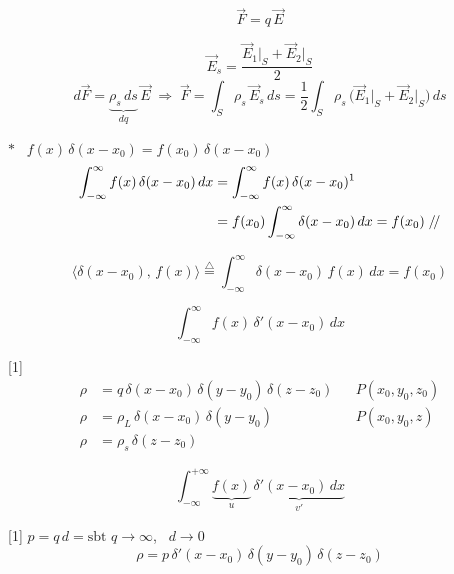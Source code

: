 \documentclass[11pt,a4paper]{article}
\begin{document}

\noindent
\begin{minipage}[c]{0.55\linewidth}
\centering
{}
\end{minipage}\hfill
\begin{minipage}[c]{0.4\linewidth}
\[ \vec F = q\,\vec E \]
\end{minipage}

\[ \vec E_s = \frac{\vec E_1\big|_S+\vec E_2\big|_S}{2} \]
\[ d\vec F = \underbrace{\rho_s\,ds}_{dq}\,\vec E \;\Rightarrow\; \vec F = \int_S \rho_s\,\vec E_s\,ds = \frac12\int_S \rho_s\,\bigl(\vec E_1\big|_S+\vec E_2\big|_S\bigr)\,ds \]

$\ast$ \ $f(x)\,\delta(x-x_0) = f(x_0)\,\delta(x-x_0)$
\begin{align*}
\int_{-\infty}^{\infty} f(x)\,\delta(x-x_0)\,dx &= \int_{-\infty}^{\infty} f(x)\,\delta(x-x_0)\text{\footnotemark} \\
 &= f(x_0)\int_{-\infty}^{\infty}\delta(x-x_0)\,dx = f(x_0)\;/\!/
\end{align*}

\[ \langle \delta(x-x_0),\,f(x)\rangle \overset{\triangle}{=} \int_{-\infty}^{\infty}\delta(x-x_0)\,f(x)\,dx = f(x_0) \]

\[ \int_{-\infty}^{\infty} f(x)\,\delta'(x-x_0)\,dx \]

[1]
\begin{align*}
\rho &= q\,\delta(x-x_0)\,\delta(y-y_0)\,\delta(z-z_0) &&  P(x_0,y_0,z_0) \\
\rho &= \rho_L\,\delta(x-x_0)\,\delta(y-y_0) &&  P(x_0,y_0,z) \\
\rho &= \rho_s\,\delta(z-z_0)
\end{align*}

\[ \int_{-\infty}^{+\infty}\underbrace{f(x)}_{u}\,\underbrace{\delta'(x-x_0)\,dx}_{v'} \]

[1]
$p = q\,d = \text{sbt}$ \qquad $q\to\infty$, \ $d\to 0$
\[ \rho = p\,\delta'(x-x_0)\,\delta(y-y_0)\,\delta(z-z_0) \]
\end{document}
